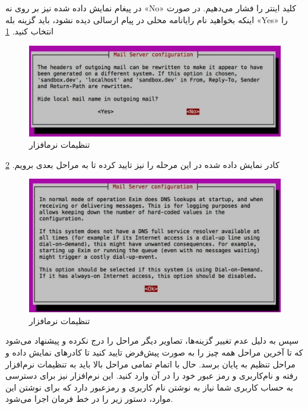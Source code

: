 در پیغام نمایش داده شده نیز بر روی نه «No» کلید اینتر را فشار می‌دهیم. در صورت اینکه بخواهید نام رایانامه محلی در پیام ارسالی دیده نشود، باید گزینه بله «Yes» را انتخاب کنید. \ref{MAIL-SERVER-EXIM8}

\begin{figure}
    \includegraphics[width=.9\textwidth ,height=.35\textwidth]{Pic/EXIM8}
    \caption{ تنظیمات نرمافزار 
    }
    \label{MAIL-SERVER-EXIM8}
\end{figure}
کادر نمایش داده شده در این مرحله را نیز تایید کرده تا به مراحل بعدی برویم.
 \ref{MAIL-SERVER-EXIM9}
\begin{figure}
    \includegraphics[width=.9\textwidth ,height=.50\textwidth]{Pic/EXIM9}
    \caption{ تنظیمات نرمافزار 
    }
    \label{MAIL-SERVER-EXIM9}
\end{figure}
سپس به دلیل  عدم تغییر گزینه‌ها، تصاویر دیگر مراحل را درج نکرده و پیشنهاد می‌شود که تا آخرین مراحل همه چیز را به صورت پیش‌فرض تایید کنید تا کادرهای نمایش داده و مراحل تنظیم به پایان برسد. حال با اتمام تمامی مراحل بالا باید به تنظیمات نرم‌افزار رفته و نام‌کاربری و رمز عبور خود را در آن وارد کنید. این نرم‌افزار نیز برای دسترسی به حساب کاربری شما نیاز به نوشتن نام کاربری و رمز‌عبور دارد که برای نوشتن این موارد، دستور زیر را در خط فرمان اجرا می‌شود.
\newline
\begin{latin}  
    
\end{latin}
